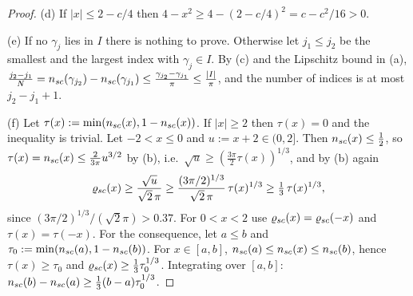 \begin{proof}
(d) If $|x|\le2-c/4$ then $4-x^2\ge4-(2-c/4)^2=c-c^2/16>0$.

(e) If no $\gamma_j$ lies in $I$ there is nothing to prove. Otherwise let $j_1\le j_2$ be the smallest and the largest index with $\gamma_j\in I$. By (c) and the Lipschitz bound in (a),
$\frac{j_2-j_1}N=n_{sc}(\gamma_{j_2})-n_{sc}(\gamma_{j_1})\le\frac{\gamma_{j_2}-\gamma_{j_1}}\pi\le\frac{|I|}\pi$, and the number of indices is at most $j_2-j_1+1$.

(f) Let $\tau(x):=\min(n_{sc}(x),1-n_{sc}(x))$. If $|x|\ge2$ then $\tau(x)=0$ and the inequality is trivial. Let $-2<x\le0$ and $u:=x+2\in(0,2]$. Then $n_{sc}(x)\le\frac12$, so $\tau(x)=n_{sc}(x)\le\frac2{3\pi}u^{3/2}$ by (b), i.e.\ $\sqrt u\ge(\frac{3\pi}2\tau(x))^{1/3}$, and by (b) again
\[
 \varrho_{sc}(x)\ge\frac{\sqrt u}{\sqrt2\,\pi}\ge\frac{(3\pi/2)^{1/3}}{\sqrt2\,\pi}\,\tau(x)^{1/3}\ge\tfrac13\,\tau(x)^{1/3},
\]
since $(3\pi/2)^{1/3}/(\sqrt2\pi)>0.37$. For $0<x<2$ use $\varrho_{sc}(x)=\varrho_{sc}(-x)$ and $\tau(x)=\tau(-x)$.
For the consequence, let $a\le b$ and $\tau_0:=\min(n_{sc}(a),1-n_{sc}(b))$. For $x\in[a,b]$, $n_{sc}(a)\le n_{sc}(x)\le n_{sc}(b)$, hence $\tau(x)\ge\tau_0$ and $\varrho_{sc}(x)\ge\frac13\tau_0^{1/3}$. Integrating over $[a,b]$:
$n_{sc}(b)-n_{sc}(a)\ge\frac13(b-a)\tau_0^{1/3}$.
\end{proof}

